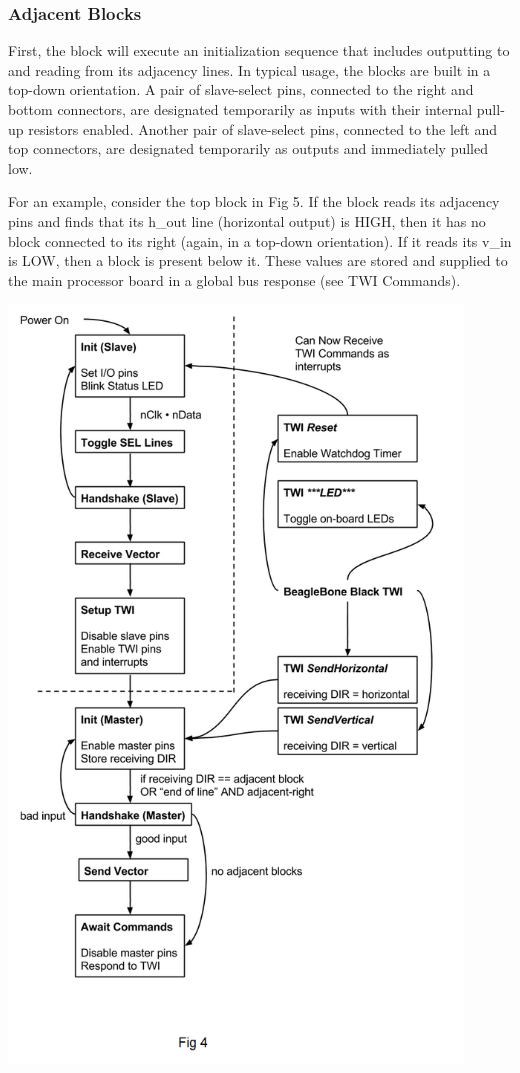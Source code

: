 \documentclass[12pt,a4paper]{article}
\begin{document}
  \subsubsection{Adjacent Blocks}  
  First, the block will execute an initialization sequence that includes outputting to and reading from its adjacency lines. In typical usage, the blocks are built in a top-down orientation. A pair of slave-select pins, connected to the right and bottom connectors, are designated temporarily as inputs with their internal pull-up resistors enabled. Another pair of slave-select pins, connected to the left and top connectors, are designated temporarily as outputs and immediately pulled low. 
  
  For an example, consider the top block in Fig 5. If the block reads its adjacency pins and finds that its h\_out line (horizontal output) is HIGH, then it has no block connected to its right (again, in a top-down orientation). If it reads its v\_in is LOW, then a block is present below it. These values are stored and supplied to the main processor board in a global bus response (see TWI Commands).
  
    \includegraphics[width=4.75in]{USD.png}\\
    
\end{document}

